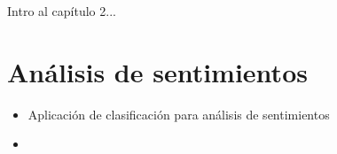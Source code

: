 Intro al capítulo 2...

\section{Análisis de sentimientos}

\begin{itemize}
    \item Aplicación de clasificación para análisis de sentimientos
    \item 
\end{itemize}